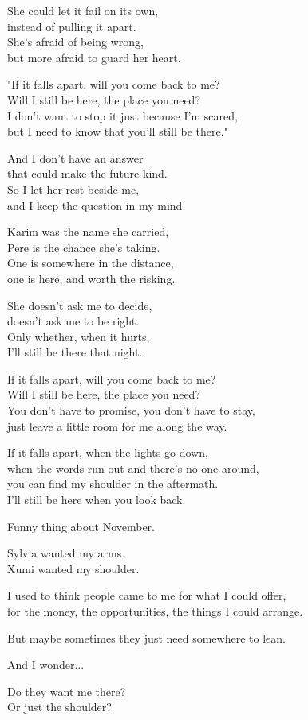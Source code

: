\begin{lyrics}
She could let it fail on its own,\\
instead of pulling it apart.\\
She's afraid of being wrong,\\
but more afraid to guard her heart.

"If it falls apart, will you come back to me?\\
Will I still be here, the place you need?\\
I don't want to stop it just because I'm scared,\\
but I need to know that you'll still be there."

And I don't have an answer\\
that could make the future kind.\\
So I let her rest beside me,\\
and I keep the question in my mind.

Karim was the name she carried,\\
Pere is the chance she's taking.\\
One is somewhere in the distance,\\
one is here, and worth the risking.

She doesn't ask me to decide,\\
doesn't ask me to be right.\\
Only whether, when it hurts,\\
I'll still be there that night.

If it falls apart, will you come back to me?\\
Will I still be here, the place you need?\\
You don't have to promise, you don't have to stay,\\
just leave a little room for me along the way.

If it falls apart, when the lights go down,\\
when the words run out and there's no one around,\\
you can find my shoulder in the aftermath.\\
I'll still be here when you look back.

Funny thing about November.

Sylvia wanted my arms.\\
Xumi wanted my shoulder.

I used to think people came to me for what I could offer,\\
for the money, the opportunities, the things I could arrange.

But maybe sometimes they just need somewhere to lean.

And I wonder...

Do they want me there?\\
Or just the shoulder?
\end{lyrics}

